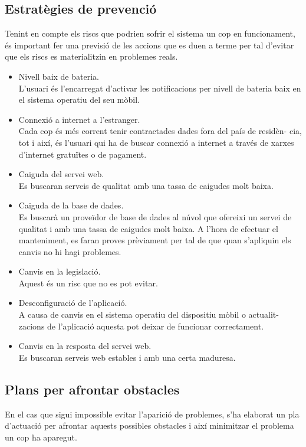 \subsection{Estratègies de prevenció}
Tenint en compte els riscs que podrien sofrir el sistema un cop en funcionament, és important fer una previsió de les accions que es duen a terme per tal d’evitar que els riscs es materialitzin en problemes reals.
\begin{itemize}
\item{}Nivell baix de bateria.\\
L’usuari és l’encarregat d’activar les notificacions per nivell de bateria
baix en el sistema operatiu del seu mòbil.
\item{}Connexió a internet a l’estranger.\\
Cada cop és més corrent tenir contractades dades fora del país de residèn-
cia, tot i així, és l’usuari qui ha de buscar connexió a internet a través de xarxes d’internet gratuïtes o de pagament.
\item{}Caiguda del servei web.\\
Es buscaran serveis de qualitat amb una tassa de caigudes molt baixa.
\item{}Caiguda de la base de dades.\\
Es buscarà un proveïdor de base de dades al núvol que ofereixi un servei
de qualitat i amb una tassa de caigudes molt baixa. A l’hora de efectuar el
manteniment, es faran proves prèviament per tal de que quan s’apliquin
els canvis no hi hagi problemes.
\item{}Canvis en la legislació.\\
Aquest és un risc que no es pot evitar.
\item{}Desconfiguració de l’aplicació.\\
A causa de canvis en el sistema operatiu del dispositiu mòbil o actualit-
zacions de l’aplicació aquesta pot deixar de funcionar correctament.
\item{}Canvis en la resposta del servei web.\\
Es buscaran serveis web estables i amb una certa maduresa.

\end{itemize}

\subsection{Plans per afrontar obstacles}

En el cas que sigui impossible evitar l’aparició de problemes, s’ha elaborat un pla d’actuació per afrontar aquests possibles obstacles i així minimitzar el problema un cop ha aparegut.

